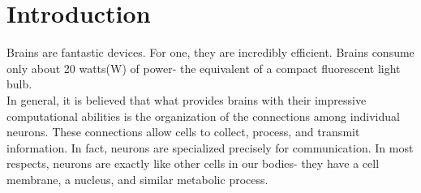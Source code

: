 % 
%
%
%
%
%
%
%
%
%
%

\section{Introduction}
Brains are fantastic devices. For one, they are incredibly efficient. Brains consume only about 20 watts(W) of power- the equivalent of a compact fluorescent light bulb.\\

In general, it is believed that what provides brains with their impressive computational abilities is the organization of the connections among individual neurons. These connections allow cells to collect, process, and transmit information. In fact, neurons are specialized precisely for communication. In most respects, neurons are exactly like other cells in our bodies- they have a cell membrane, a nucleus, and similar metabolic process. \\

